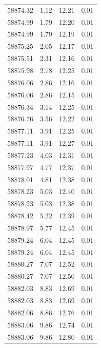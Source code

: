 \begin{longtable}{|c|c|c|c|}
 58874.32 &    1.12 &       12.21 &          0.01 \\
 58874.99 &    1.79 &       12.20 &          0.01 \\
 58874.99 &    1.79 &       12.19 &          0.01 \\
 58875.25 &    2.05 &       12.17 &          0.01 \\
 58875.51 &    2.31 &       12.16 &          0.01 \\
 58875.98 &    2.78 &       12.25 &          0.01 \\
 58876.06 &    2.86 &       12.16 &          0.01 \\
 58876.06 &    2.86 &       12.15 &          0.01 \\
 58876.34 &    3.14 &       12.25 &          0.01 \\
 58876.76 &    3.56 &       12.22 &          0.01 \\
 58877.11 &    3.91 &       12.25 &          0.01 \\
 58877.11 &    3.91 &       12.27 &          0.01 \\
 58877.23 &    4.03 &       12.31 &          0.01 \\
 58877.97 &    4.77 &       12.37 &          0.01 \\
 58878.01 &    4.81 &       12.38 &          0.01 \\
 58878.23 &    5.03 &       12.40 &          0.01 \\
 58878.23 &    5.03 &       12.38 &          0.01 \\
 58878.42 &    5.22 &       12.39 &          0.01 \\
 58878.97 &    5.77 &       12.45 &          0.01 \\
 58879.24 &    6.04 &       12.45 &          0.01 \\
 58879.24 &    6.04 &       12.45 &          0.01 \\
 58880.27 &    7.07 &       12.52 &          0.01 \\
 58880.27 &    7.07 &       12.50 &          0.01 \\
 58882.03 &    8.83 &       12.69 &          0.01 \\
 58882.03 &    8.83 &       12.69 &          0.01 \\
 58882.06 &    8.86 &       12.76 &          0.01 \\
 58883.06 &    9.86 &       12.74 &          0.01 \\
 58883.06 &    9.86 &       12.80 &          0.01 \\

\end{longtable}
